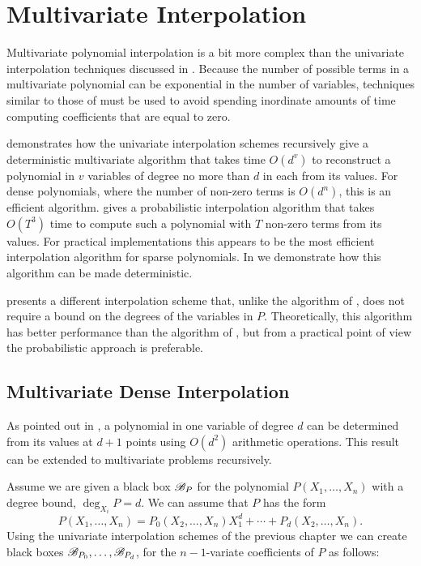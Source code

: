 \chapter{Multivariate Interpolation}
\label{Sparse:Interp:Chap}

Multivariate polynomial interpolation is a bit more complex than the
univariate interpolation techniques discussed in
.  Because the number of possible terms in
a multivariate polynomial can be exponential in the number of
variables, techniques similar to those of 
must be used to avoid spending inordinate amounts of time computing
coefficients that are equal to zero.

 demonstrates how
the univariate interpolation schemes recursively give a
deterministic multivariate algorithm that takes time $O(d^v)$ to 
reconstruct a polynomial in $v$ variables of degree no more than $d$ in 
each from its values.  For dense polynomials, where the number of 
non-zero terms is $O(d^n)$, this is an efficient algorithm.  
 gives a probabilistic interpolation algorithm that
takes $O(T^3)$ time to compute such a polynomial with $T$ non-zero terms 
from its values.  For practical 
implementations this appears to be the most efficient interpolation
algorithm for sparse polynomials.  In  we
demonstrate how this algorithm can be made deterministic.

 presents a different interpolation scheme
that, unlike the algorithm of , does not
require a bound on the degrees of the variables in $P$.
Theoretically, this algorithm has better performance than the
algorithm of , but from a practical point
of view the probabilistic approach is preferable.


\section{Multivariate Dense Interpolation}
\label{Interp:MDense:Sec}

As pointed out in , a polynomial in one variable
of degree $d$ can be determined from its values at $d+1$ points using
$O(d^2)$ arithmetic operations.  This result can be extended to
multivariate problems recursively.

Assume we are given a black box ${\cal B}_P$ for the polynomial
$P(X_1, \ldots, X_n)$ with a degree bound, $\deg_{X_i} P = d$.  
We can assume that $P$ has the form
\[
P(X_1, \ldots, X_n) = P_0(X_2, \ldots, X_n) X_1^d + 
\cdots + P_d(X_2, \ldots, X_n).
\]
Using the univariate interpolation schemes of the previous chapter
we can create black boxes ${\cal B}_{P_0}, \ldots, {\cal B}_{P_d}$, for
the $n-1$-variate coefficients of $P$ as follows:

